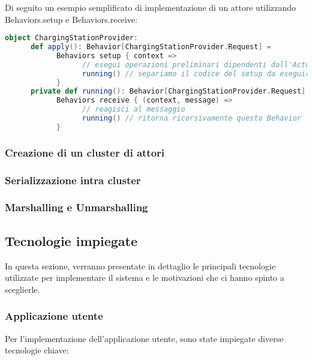 Di seguito un esempio semplificato di implementazione di un attore utilizzando Behaviors.setup e Behaviors.receive:\\

\begin{lstlisting}[language=scala]
object ChargingStationProvider:
      def apply(): Behavior[ChargingStationProvider.Request] = 
            Behaviors setup { context =>
                  // esegui operazioni preliminari dipendenti dall'Actor Context
                  running() // separiamo il codice del setup da eseguire una sola volta con il codice effettivo del Behavior
            }
      private def running(): Behavior[ChargingStationProvider.Request] = 
            Behaviors receive { (context, message) =>
                  // reagisci al messaggio
                  running() // ritorna ricorsivamente questo Behavior
            }
\end{lstlisting}

\subsubsection{Creazione di un cluster di attori}

\subsubsection*{Serializzazione intra cluster}

\subsubsection*{Marshalling e Unmarshalling}

\subsection{Tecnologie impiegate}

In questa sezione, verranno presentate in dettaglio le principali tecnologie utilizzate per implementare il sistema e le motivazioni che ci hanno spinto a sceglierle.

\subsubsection{Applicazione utente}

Per l'implementazione dell'applicazione utente, sono state impiegate diverse tecnologie chiave:

